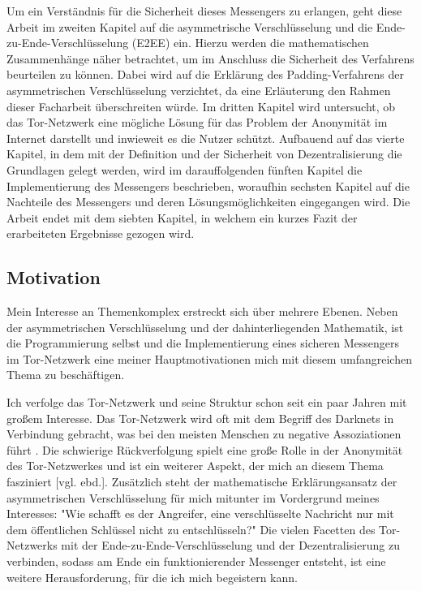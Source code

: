 \documentclass[a4paper,ngerman, headheight=28pt,12pt]{scrartcl}
\newcommand{\vcite}[1]{\cite[vgl.][]{#1}}
\newcommand{\vebd}{[vgl. ebd.]}
\begin{document}
Um ein Verständnis für die Sicherheit dieses Messengers zu erlangen, geht diese Arbeit im zweiten Kapitel auf die asymmetrische Verschlüsselung und die Ende-zu-Ende-Verschlüsselung (E2EE) ein. Hierzu werden die mathematischen Zusammenhänge näher betrachtet, um im Anschluss die Sicherheit des Verfahrens beurteilen zu können.
Dabei wird auf die Erklärung des Padding-Verfahrens der asymmetrischen Verschlüsselung verzichtet, da eine Erläuterung den Rahmen dieser Facharbeit überschreiten würde. Im dritten Kapitel wird untersucht, ob das Tor-Netzwerk eine mögliche Lösung für das Problem der Anonymität im Internet darstellt und inwieweit es die Nutzer schützt.
Aufbauend auf das vierte Kapitel, in dem mit der Definition und der Sicherheit von Dezentralisierung die Grundlagen gelegt werden, wird im darauffolgenden fünften Kapitel die Implementierung des Messengers beschrieben, woraufhin sechsten Kapitel auf die Nachteile des Messengers und deren Lösungsmöglichkeiten eingegangen wird. Die Arbeit endet mit dem siebten Kapitel, in welchem ein kurzes Fazit der erarbeiteten Ergebnisse gezogen wird.

\subsection{Motivation}
Mein Interesse an Themenkomplex erstreckt sich über mehrere Ebenen. Neben der asymmetrischen Verschlüsselung und der dahinterliegenden Mathematik, ist die Programmierung selbst und die Implementierung eines sicheren Messengers im Tor-Netzwerk eine meiner Hauptmotivationen mich mit diesem umfangreichen Thema zu beschäftigen.

Ich verfolge das Tor-Netzwerk und seine Struktur schon seit ein paar Jahren mit großem Interesse. Das Tor-Netzwerk wird oft mit dem Begriff des Darknets in Verbindung gebracht, was bei den meisten Menschen zu negative Assoziationen führt \vcite{BsiTorDarknet}. Die schwierige Rückverfolgung spielt eine große Rolle in der Anonymität des Tor-Netzwerkes und ist ein weiterer Aspekt, der mich an diesem Thema fasziniert \vebd.
Zusätzlich steht der mathematische Erklärungsansatz der asymmetrischen Verschlüsselung für mich mitunter im Vordergrund meines Interesses: "Wie schafft es der Angreifer, eine verschlüsselte Nachricht nur mit dem öffentlichen Schlüssel nicht zu entschlüsseln?"
Die vielen Facetten des Tor-Netzwerks mit der Ende-zu-Ende-Verschlüsselung und der Dezentralisierung zu verbinden, sodass am Ende ein funktionierender Messenger entsteht, ist eine weitere Herausforderung, für die ich mich begeistern kann.
\end{document}
